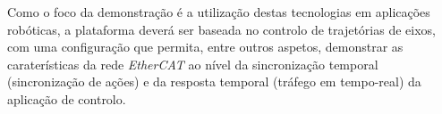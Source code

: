Como o foco da demonstração é a utilização destas tecnologias em aplicações robóticas, a plataforma deverá ser baseada no controlo de trajetórias de eixos, com uma
configuração que permita, entre outros aspetos, demonstrar as caraterísticas da rede \textit{EtherCAT} ao nível da sincronização temporal (sincronização de ações) e da resposta
temporal (tráfego em tempo-real) da aplicação de controlo.

% 
% 
